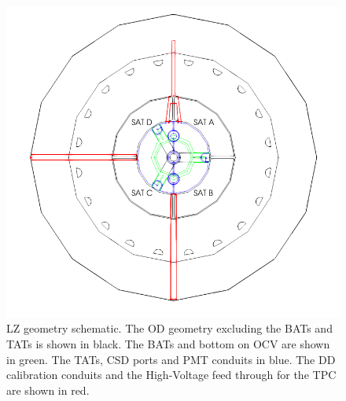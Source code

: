 \begin{figure}[]
\includegraphics[width=\textwidth]{Figures/Geometry/geometry_with_conduits.png}
\centering
\caption{LZ geometry schematic. The OD geometry excluding the BATs and TATs is shown in black. The BATs and bottom on OCV are shown in green. The TATs, CSD ports and PMT conduits in blue. The DD calibration conduits and the High-Voltage feed through for the TPC are shown in red.}
\label{fig:OD_conduit_geometry}
\end{figure}





